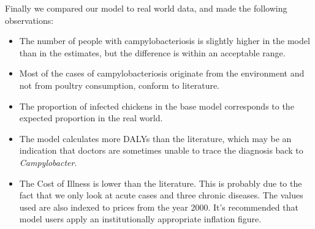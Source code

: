 Finally we compared our model to real world data, and made the following observations:
\begin{itemize}
    \item The number of people with campylobacteriosis is slightly higher in the model than in the estimates, but the difference is within an acceptable range.
    \item Most of the cases of campylobacteriosis originate from the environment and not from poultry consumption, conform to literature.
    \item The proportion of infected chickens in the base model corresponds to the expected proportion in the real world.
    \item The model calculates more DALYs than the literature, which may be an indication that doctors are sometimes unable to trace the diagnosis back to \textit{Campylobacter}.
    \item The Cost of Illness is lower than the literature. This is probably due to the fact that we only look at acute cases and three chronic diseases. The values used are also indexed to prices from the year 2000. It's recommended that model users apply an institutionally appropriate inflation figure.
\end{itemize}

